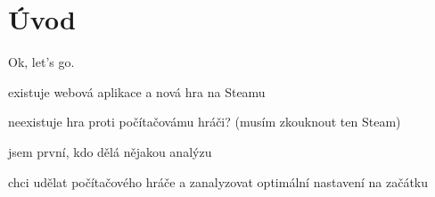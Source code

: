 \chapter*{Úvod}

Ok, let's go.

existuje webová aplikace a nová hra na Steamu

neexistuje hra proti počítačovámu hráči? (musím zkouknout ten Steam)

jsem první, kdo dělá nějakou analýzu

chci udělat počítačového hráče a zanalyzovat optimální nastavení na začátku



